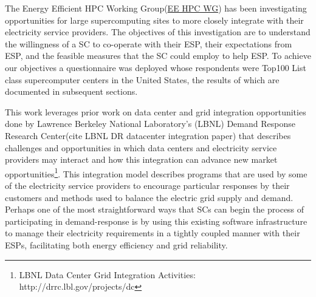 The Energy Efficient HPC Working Group(\href {http://eehpcwg.lbl.gov/}{EE HPC WG}) has been investigating opportunities for large supercomputing sites to more closely integrate with their electricity service providers.
The objectives of this investigation are to understand the willingness of a SC to co-operate with their ESP, their expectations from ESP, and the feasible measures that the SC could employ to help ESP. 
To achieve our objectives a questionnaire was deployed whose respondents were Top100 List class supercomputer centers in the United States, the results of which are documented in subsequent sections.

This work leverages prior work on data center and grid integration opportunities
done by Lawrence Berkeley National Laboratory's (LBNL) Demand Response Research Center(cite LBNL DR datacenter integration paper)
that describes challenges and opportunities in which data centers and electricity
service providers may interact and how this integration can advance new market opportunities\footnote{LBNL
Data Center Grid Integration Activities: http://drrc.lbl.gov/projects/dc}.
This integration model describes programs that are used by some of the electricity service providers to encourage particular responses by their customers and methods used to balance the electric grid supply and demand.
Perhaps one of the most straightforward ways that SCs can begin the process of participating in demand-response is by using this existing software infrastructure to manage their electricity requirements in a tightly coupled manner with their ESPs, facilitating both energy efficiency and grid reliability.


